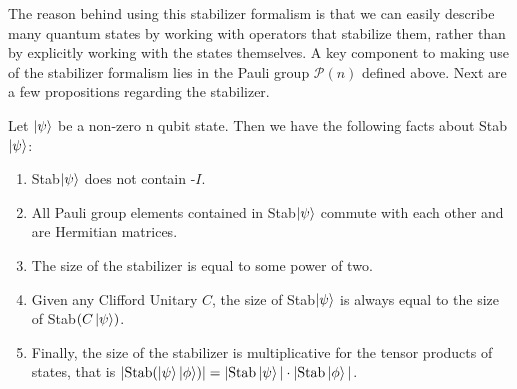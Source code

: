 \documentclass[12pt]{dalthesis}
\begin{document}
The reason behind using this stabilizer formalism is that we can easily describe many quantum states by working with operators that stabilize them, rather than by explicitly working with the states themselves. A key component to making use of the stabilizer formalism lies in the Pauli group $\mathcal{P}(n)$ defined above. Next are a few propositions regarding the stabilizer.

\begin{proposition}
\label{stabilizerfacts}
Let $\ket{\psi}$ be a non-zero n qubit state. Then we have the following facts about Stab$\ket{\psi}$:
\begin{enumerate}
\item Stab$\ket{\psi}$ does not contain -$I$.
\item All Pauli group elements contained in Stab$\ket{\psi}$ commute with each other and are Hermitian matrices.
\item The size of the stabilizer is equal to some power of two.
\item Given any Clifford Unitary $C$, the size of Stab$\ket{\psi}$ is always equal to the size of Stab$(C \ket{\psi})$.
\item Finally, the size of the stabilizer is multiplicative for the tensor products of states, that is $| \text{Stab} (\ket{\psi} \ket{\phi})| = |\text{Stab}\ket{\psi}| \cdot |\text{Stab}\ket{\phi}|$. 
\end{enumerate}
\end{proposition}
\end{document}
